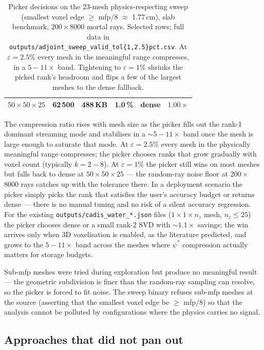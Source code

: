 \begin{table}[t]
\begin{tabular}{l r r r l r}
    $50\!\times\!50\!\times\!25$     & 62\,500  & 488\,KB   & 1.0\,\% & dense    & $1.00\times$ \\
    \bottomrule
  \end{tabular}
  \caption{Picker decisions on the 23-mesh physics-respecting
    sweep (smallest voxel edge $\ge$ mfp/8 $\approx$ 1.77\,cm),
    slab benchmark, $200\times 8000$ mortal rays. Selected rows;
    full data in
    \texttt{outputs/adjoint\_sweep\_valid\_tol\{1,2.5\}pct.csv}.
    At $\varepsilon=2.5\%$ every mesh in the meaningful range
    compresses, in a $5{-}11\times$ band. Tightening to
    $\varepsilon=1\%$ shrinks the picked rank's headroom and
    flips a few of the largest meshes to the dense fallback.}
  \label{tab:adjoint-picker-sweep}
\end{table}

The compression ratio rises with mesh size as the picker fills
out the rank-1 dominant streaming mode and stabilises in a
$\sim 5{-}11\times$ band once the mesh is large enough to
saturate that mode. At $\varepsilon=2.5\%$ every mesh in the
physically meaningful range compresses; the picker chooses ranks
that grow gradually with voxel count (typically $k{=}2{-}8$).
At $\varepsilon=1\%$ the picker still wins on most meshes but
falls back to dense at $50\!\times\!50\!\times\!25$ — the
random-ray noise floor at 200\,$\times$\,8000 rays catches up
with the tolerance there. In a deployment scenario the picker
simply picks the rank that satisfies the user's accuracy budget
or returns dense — there is no manual tuning and no risk of a
silent accuracy regression. For the existing
\texttt{outputs/cadis\_water\_*.json} files
($1\!\times\!1\!\times\!n_z$ mesh, $n_z \le 25$) the picker
chooses dense or a small rank-2 SVD with $\sim 1.1\times$
savings; the win arrives only when 3D voxelisation is enabled,
as the literature predicted, and grows to the $5{-}11\times$
band across the meshes where $\psi^{*}$ compression actually
matters for storage budgets.

Sub-mfp meshes were tried during exploration but produce no
meaningful result — the geometric subdivision is finer than the
random-ray sampling can resolve, so the picker is forced to fit
noise. The sweep binary refuses sub-mfp meshes at the source
(asserting that the smallest voxel edge be $\ge$ mfp/8) so that
the analysis cannot be polluted by configurations where the
physics carries no signal.

\subsection{Approaches that did not pan out}
\label{subsec:adjoint-negatives}

